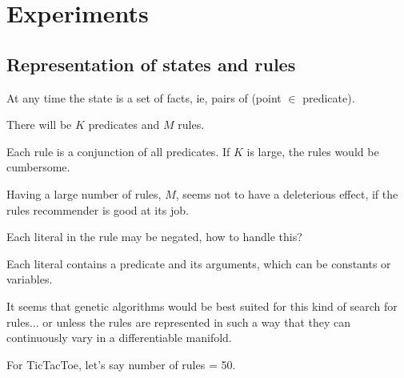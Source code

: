 \chapter{Experiments}\label{chap:Experiments}

\section{Representation of states and rules}

At any time the state is a set of facts, ie, pairs of (point $\in$ predicate).

There will be $K$ predicates and $M$ rules.

Each rule is a conjunction of all predicates.  If $K$ is large, the rules would be cumbersome.

Having a large number of rules, $M$, seems not to have a deleterious effect, if the rules recommender is good at its job.

Each literal in the rule may be negated, how to handle this?

Each literal contains a predicate and its arguments, which can be constants or variables.

It seems that genetic algorithms would be best suited for this kind of search for rules...  or unless the rules are represented in such a way that they can continuously vary in a differentiable manifold.

For TicTacToe, let's say number of rules = 50.

